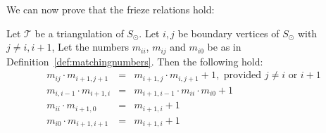 \documentclass[a4paper]{amsart}
\begin{document}
We can now prove that the frieze relations hold:

\begin{prop} \label{prop:relations}
Let ${\mathcal T}$ be a triangulation of $S_{\odot}$.
Let $i,j$ be boundary vertices of $S_{\odot}$ with $j\neq i,i+1$,
Let the numbers $m_{ii}$, $m_{ij}$ and $m_{i0}$ be as in
Definition~\ref{def:matchingnumbers}. Then the following hold:
\begin{eqnarray}
m_{ij}\cdot m_{i+1,j+1} & = & m_{i+1,j}\cdot m_{i,j+1} + 1,
\mbox{ provided $j\not=i$ or $i+1$}
\label{eqn:relation1prop}
\\
m_{i,i-1}\cdot m_{i+1,i} & = & m_{i+1,i-1}\cdot m_{ii}\cdot m_{i0}+1
\label{eqn:relation2prop} \\
m_{ii}\cdot m_{i+1,0} & = & m_{i+1,i} + 1
\label{eqn:relation3prop} \\
m_{i0}\cdot m_{i+1,i+1} & = & m_{i+1,i} + 1
\label{eqn:relation4prop}
\end{eqnarray}
\end{prop}
\end{document}
